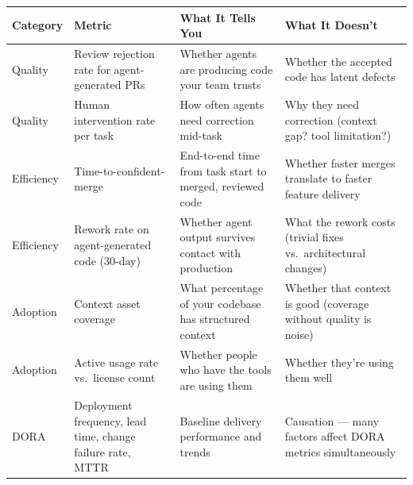 \documentclass[
  a4paper,
  DIV=11,
  numbers=noendperiod]{scrreprt}
\newcounter{none} %
\begin{document}
{\def\LTcaptype{none} %
\begin{longtable}[]{@{}
  >{\raggedright\arraybackslash}p{}
  >{\raggedright\arraybackslash}p{}
  >{\raggedright\arraybackslash}p{}
  >{\raggedright\arraybackslash}p{}@{}}
\toprule\noalign{}
\begin{minipage}[b]{\linewidth}\raggedright
Category
\end{minipage} & \begin{minipage}[b]{\linewidth}\raggedright
Metric
\end{minipage} & \begin{minipage}[b]{\linewidth}\raggedright
What It Tells You
\end{minipage} & \begin{minipage}[b]{\linewidth}\raggedright
What It Doesn't
\end{minipage} \\
\midrule\noalign{}
\endhead
\bottomrule\noalign{}
\endlastfoot
Quality & Review rejection rate for agent-generated PRs & Whether agents
are producing code your team trusts & Whether the accepted code has
latent defects \\
Quality & Human intervention rate per task & How often agents need
correction mid-task & Why they need correction (context gap? tool
limitation?) \\
Efficiency & Time-to-confident-merge & End-to-end time from task start
to merged, reviewed code & Whether faster merges translate to faster
feature delivery \\
Efficiency & Rework rate on agent-generated code (30-day) & Whether
agent output survives contact with production & What the rework costs
(trivial fixes vs.~architectural changes) \\
Adoption & Context asset coverage & What percentage of your codebase has
structured context & Whether that context is good (coverage without
quality is noise) \\
Adoption & Active usage rate vs.~license count & Whether people who have
the tools are using them & Whether they're using them well \\
DORA & Deployment frequency, lead time, change failure rate, MTTR &
Baseline delivery performance and trends & Causation --- many factors
affect DORA metrics simultaneously \\
\end{longtable}
}
\end{document}
